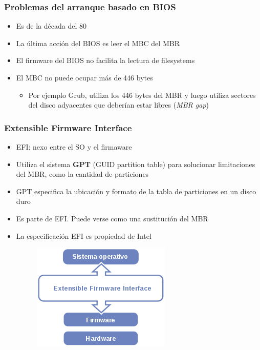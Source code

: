 \begin{frame}
	\frametitle{Problemas del arranque basado en BIOS}
	\begin{itemize}
		\item Es de la década del 80
		\item La última acción del BIOS es leer el MBC del MBR
		\item El firmware del BIOS no facilita la lectura de filesystems
		\item El MBC no puede ocupar más de 446 bytes
		\begin{itemize}
			\item Por ejemplo Grub, utiliza los 446 bytes del MBR y luego utiliza sectores del disco adyacentes que deberían estar libres (\textit{MBR gap})
		\end{itemize}
	\end{itemize}
\end{frame}

\begin{frame}
	\frametitle{Extensible Firmware Interface}
	\begin{itemize}
		\item EFI: nexo entre el SO y el firmaware
		\item Utiliza el sistema \textbf{GPT} (GUID partition table) para solucionar limitaciones del MBR, como la cantidad de particiones
		\item GPT especifica la ubicación y formato de la tabla de particiones en un disco duro
		\item Es parte de EFI. Puede verse como una sustitución del MBR
		\item La especificación EFI es propiedad de Intel
		\begin{figure}
			\centering
			\includegraphics[scale=0.3]{images/efi.png}
		\end{figure}
	\end{itemize}
\end{frame}

